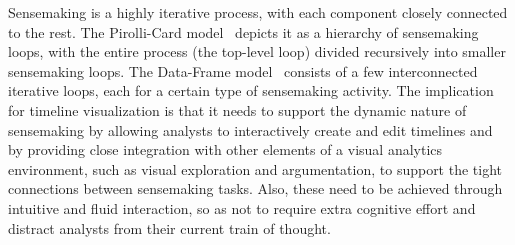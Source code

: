 
Sensemaking is a highly iterative process, with each component closely connected to the rest. The Pirolli-Card model~\cite{Pirolli2005} depicts it as a hierarchy of sensemaking loops, with the entire process (the top-level loop) divided recursively into smaller sensemaking loops. The Data-Frame model~\cite{Klein2003} consists of a few interconnected iterative loops, each for a certain type of sensemaking activity. The implication for timeline visualization is that it needs to support the dynamic nature of sensemaking by allowing analysts to interactively create and edit timelines and by providing close integration with other elements of a visual analytics environment, such as visual exploration and argumentation, to support the tight connections between sensemaking tasks. Also, these need to be achieved through intuitive and fluid interaction, so as not to require extra cognitive effort and distract analysts from their current train of thought. 

